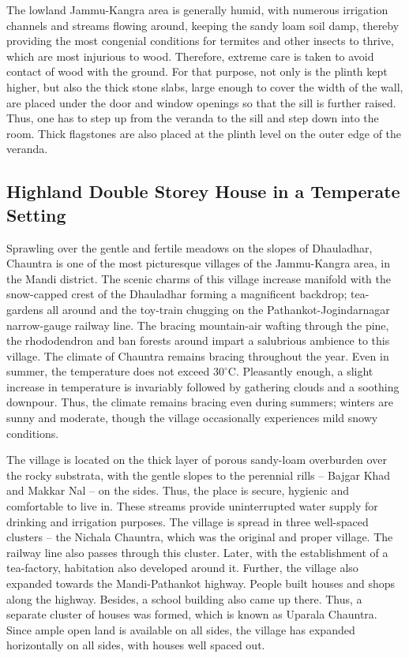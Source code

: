 The lowland Jammu-Kangra area is generally humid, with numerous irrigation channels and streams flowing around, keeping the sandy loam soil damp, thereby providing the most congenial conditions for termites and other insects to thrive, which are most injurious to wood. Therefore, extreme care is taken to avoid contact of wood with the ground. For that purpose, not only is the plinth kept higher, but also the thick stone slabs, large enough to cover the width of the wall, are placed under the door and window openings so that the sill is further raised. Thus, one has to step up from the veranda to the sill and step down into the room. Thick flagstones are also placed at the plinth level on the outer edge of the veranda.


\subsection*{Highland Double Storey House in a Temperate Setting}

Sprawling over the gentle and fertile meadows on the slopes of Dhauladhar, Chauntra is one of the most picturesque villages of the Jammu-Kangra area, in the Mandi district. The scenic charms of this village increase manifold with the snow-capped crest of the Dhauladhar forming a magnificent backdrop; tea-gardens all around and the toy-train chugging on the Pathankot-Jogindarnagar narrow-gauge railway line. The bracing mountain-air wafting through the pine, the rhododendron and ban forests around impart a salubrious ambience to this village. The climate of Chauntra remains bracing throughout the year. Even in summer, the temperature does not exceed $30^{\circ}$C. Pleasantly enough, a slight increase in temperature is invariably followed by gathering clouds and a soothing downpour. Thus, the climate remains bracing even during summers; winters are sunny and moderate, though the village occasionally experiences mild snowy conditions.

The village is located on the thick layer of porous sandy-loam overburden over the rocky substrata, with the gentle slopes to the perennial rills -- Bajgar Khad and Makkar Nal -- on the sides. Thus, the place is secure, hygienic and comfortable to live in. These streams provide uninterrupted water supply for drinking and irrigation purposes. The village is spread in three well-spaced clusters -- the Nichala Chauntra, which was the original and proper village. The railway line also passes through this cluster. Later, with the establishment of a tea-factory, habitation also developed around it. Further, the village also expanded towards the Mandi-Pathankot highway. People built houses and shops along the highway. Besides, a school building also came up there. Thus, a separate cluster of houses was formed, which is known as Uparala Chauntra. Since ample open land is available on all sides, the village has expanded horizontally on all sides, with houses well spaced out.

